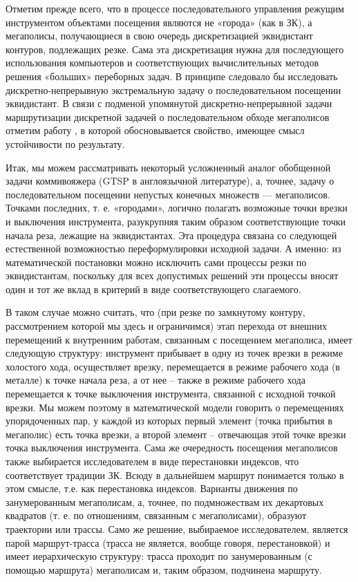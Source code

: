 \documentclass[12pt]{report}
\begin{document}
Отметим прежде всего, что в процессе последовательного управления режущим инструментом объектами посещения являются не «города» (как в ЗК), а мегаполисы, получающиеся в свою очередь дискретизацией эквидистант контуров, подлежащих резке. Сама эта дискретизация нужна для последующего использования компьютеров и соответствующих вычислительных методов решения «больших» переборных задач. В принципе следовало бы исследовать дискретно-непрерывную экстремальную задачу о последовательном посещении эквидистант. В связи с подменой упомянутой дискретно-непрерывной задачи маршрутизации дискретной задачей о последовательном обходе мегаполисов отметим работу \cite{intro01}, в которой обосновывается свойство, имеющее смысл устойчивости по результату.

Итак, мы можем рассматривать некоторый усложненный аналог обобщенной задачи коммивояжера (GTSP в англоязычной литературе), а, точнее, задачу о последовательном посещении непустых конечных множеств — мегаполисов. Точками последних, т. е. «городами», логично полагать возможные точки врезки и выключения инструмента, разукрупняя таким образом соответствующие точки начала реза, лежащие на эквидистантах. Эта процедура связана со следующей естественной возможностью переформулировки исходной задачи. А именно: из математической постановки можно исключить сами процессы резки по эквидистантам, поскольку для всех допустимых решений эти процессы вносят один и тот же вклад в критерий в виде соответствующего слагаемого.

В таком случае можно считать, что (при резке по замкнутому контуру, рассмотрением которой мы здесь и ограничимся) этап перехода от внешних перемещений к внутренним работам, связанным с посещением мегаполиса, имеет следующую структуру: инструмент прибывает в одну из точек врезки в режиме холостого хода, осуществляет врезку, перемещается в режиме рабочего хода (в металле) к точке начала реза, а от нее – также в режиме рабочего хода перемещается к точке выключения инструмента, связанной с исходной точкой врезки. Мы можем поэтому в математической модели говорить о перемещениях упорядоченных пар, у каждой из которых первый элемент (точка прибытия в мегаполис) есть точка врезки, а второй элемент – отвечающая этой точке врезки точка выключения инструмента. Сама же очередность посещения мегаполисов также выбирается исследователем в виде перестановки индексов, что соответствует традиции ЗК. Всюду в дальнейшем маршрут понимается только в этом смысле, т.е. как перестановка индексов. Варианты движения по занумерованным мегаполисам, а, точнее, по подмножествам их декартовых квадратов (т. е. по отношениям, связанным с мегаполисами), образуют траектории или трассы. Само же решение, выбираемое исследователем, является парой маршрут-трасса (трасса не является, вообще говоря, перестановкой) и имеет иерархическую структуру: трасса проходит по занумерованным (с помощью маршрута) мегаполисам и, таким образом, подчинена маршруту.
\end{document}
